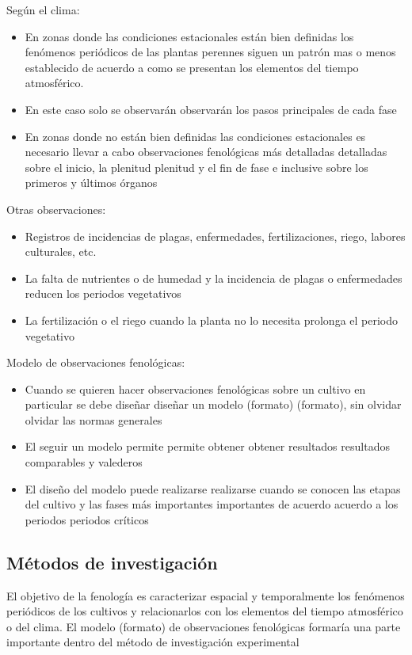 Según el clima:
\begin{itemize}
    \item En zonas donde las condiciones estacionales están bien definidas los fenómenos periódicos de las plantas perennes siguen un patrón mas o menos establecido de acuerdo a como se presentan los elementos del tiempo atmosférico.
    \item En este caso solo se observarán observarán los pasos principales de cada fase
    \item En zonas donde no están bien definidas las condiciones estacionales es necesario llevar a cabo observaciones fenológicas más detalladas detalladas sobre el inicio, la plenitud plenitud y el fin de fase e inclusive sobre los primeros y últimos órganos
\end{itemize}
Otras observaciones:
\begin{itemize}
    \item Registros de incidencias de plagas, enfermedades, fertilizaciones, riego, labores culturales, etc.
    \item La falta de nutrientes o de humedad y la incidencia de plagas o enfermedades reducen los periodos vegetativos
    \item La fertilización o el riego cuando la planta no lo necesita prolonga el periodo vegetativo
\end{itemize}
Modelo de observaciones fenológicas:

\begin{itemize}
    \item Cuando se quieren hacer observaciones fenológicas sobre un cultivo en particular se debe diseñar diseñar un modelo (formato) (formato), sin olvidar olvidar las normas generales
    \item El seguir un modelo permite permite obtener obtener resultados resultados comparables y valederos
    \item El diseño del modelo puede realizarse realizarse cuando se conocen las etapas del cultivo y las fases más importantes importantes de acuerdo acuerdo a los periodos periodos críticos
\end{itemize}
\subsection{Métodos de investigación}

El objetivo de la fenología es caracterizar espacial y temporalmente los fenómenos periódicos de los cultivos y relacionarlos con los elementos del tiempo atmosférico o del clima.
El modelo (formato) de observaciones fenológicas formaría una parte importante dentro del método de investigación experimental

